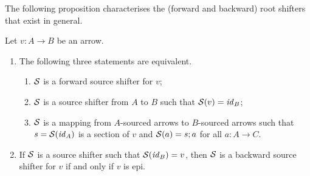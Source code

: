 The following proposition characterises the (forward and backward) root shifters that exist in general.
%
\begin{proposition}
Let $v:A\to B$ be an arrow.
\begin{enumerate}[topsep=\smallskipamount]
\item The following three statements are equivalent.
\begin{enumerate}[label=(\alph*),ref=\theenumi(\theenumii)]
\item\label{forward-1} $\mathcal{S}$ is a forward source shifter for $v$;
\item\label{forward-2} $\mathcal{S}$ is a source shifter from $A$ to $B$ such that $\mathcal{S}(v)=\mathit{id}_B$;
\item\label{forward-3} $\mathcal{S}$ is a mapping from $A$-sourced arrows to $B$-sourced arrows such that $s=\mathcal{S}(\mathit{id}_A)$ is a section of $v$ and $\mathcal{S}(a)=s;a$ for all $a:A\to C$.
\end{enumerate}
\item If $\mathcal{S}$ is a source shifter such that $\mathcal{S}(\mathit{id}_B)=v$, then $\mathcal{S}$ is a backward source shifter for $v$ if and only if $v$ is epi.
\end{enumerate}
\end{proposition}
%
